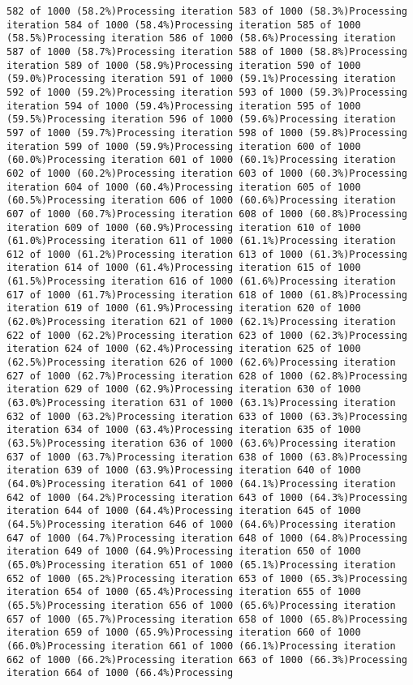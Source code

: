 \documentclass[
]{article}
\begin{document}
\begin{verbatim}
582 of 1000 (58.2%)Processing iteration 583 of 1000 (58.3%)Processing iteration 584 of 1000 (58.4%)Processing iteration 585 of 1000 (58.5%)Processing iteration 586 of 1000 (58.6%)Processing iteration 587 of 1000 (58.7%)Processing iteration 588 of 1000 (58.8%)Processing iteration 589 of 1000 (58.9%)Processing iteration 590 of 1000 (59.0%)Processing iteration 591 of 1000 (59.1%)Processing iteration 592 of 1000 (59.2%)Processing iteration 593 of 1000 (59.3%)Processing iteration 594 of 1000 (59.4%)Processing iteration 595 of 1000 (59.5%)Processing iteration 596 of 1000 (59.6%)Processing iteration 597 of 1000 (59.7%)Processing iteration 598 of 1000 (59.8%)Processing iteration 599 of 1000 (59.9%)Processing iteration 600 of 1000 (60.0%)Processing iteration 601 of 1000 (60.1%)Processing iteration 602 of 1000 (60.2%)Processing iteration 603 of 1000 (60.3%)Processing iteration 604 of 1000 (60.4%)Processing iteration 605 of 1000 (60.5%)Processing iteration 606 of 1000 (60.6%)Processing iteration 607 of 1000 (60.7%)Processing iteration 608 of 1000 (60.8%)Processing iteration 609 of 1000 (60.9%)Processing iteration 610 of 1000 (61.0%)Processing iteration 611 of 1000 (61.1%)Processing iteration 612 of 1000 (61.2%)Processing iteration 613 of 1000 (61.3%)Processing iteration 614 of 1000 (61.4%)Processing iteration 615 of 1000 (61.5%)Processing iteration 616 of 1000 (61.6%)Processing iteration 617 of 1000 (61.7%)Processing iteration 618 of 1000 (61.8%)Processing iteration 619 of 1000 (61.9%)Processing iteration 620 of 1000 (62.0%)Processing iteration 621 of 1000 (62.1%)Processing iteration 622 of 1000 (62.2%)Processing iteration 623 of 1000 (62.3%)Processing iteration 624 of 1000 (62.4%)Processing iteration 625 of 1000 (62.5%)Processing iteration 626 of 1000 (62.6%)Processing iteration 627 of 1000 (62.7%)Processing iteration 628 of 1000 (62.8%)Processing iteration 629 of 1000 (62.9%)Processing iteration 630 of 1000 (63.0%)Processing iteration 631 of 1000 (63.1%)Processing iteration 632 of 1000 (63.2%)Processing iteration 633 of 1000 (63.3%)Processing iteration 634 of 1000 (63.4%)Processing iteration 635 of 1000 (63.5%)Processing iteration 636 of 1000 (63.6%)Processing iteration 637 of 1000 (63.7%)Processing iteration 638 of 1000 (63.8%)Processing iteration 639 of 1000 (63.9%)Processing iteration 640 of 1000 (64.0%)Processing iteration 641 of 1000 (64.1%)Processing iteration 642 of 1000 (64.2%)Processing iteration 643 of 1000 (64.3%)Processing iteration 644 of 1000 (64.4%)Processing iteration 645 of 1000 (64.5%)Processing iteration 646 of 1000 (64.6%)Processing iteration 647 of 1000 (64.7%)Processing iteration 648 of 1000 (64.8%)Processing iteration 649 of 1000 (64.9%)Processing iteration 650 of 1000 (65.0%)Processing iteration 651 of 1000 (65.1%)Processing iteration 652 of 1000 (65.2%)Processing iteration 653 of 1000 (65.3%)Processing iteration 654 of 1000 (65.4%)Processing iteration 655 of 1000 (65.5%)Processing iteration 656 of 1000 (65.6%)Processing iteration 657 of 1000 (65.7%)Processing iteration 658 of 1000 (65.8%)Processing iteration 659 of 1000 (65.9%)Processing iteration 660 of 1000 (66.0%)Processing iteration 661 of 1000 (66.1%)Processing iteration 662 of 1000 (66.2%)Processing iteration 663 of 1000 (66.3%)Processing iteration 664 of 1000 (66.4%)Processing 
\end{verbatim}
\end{document}
